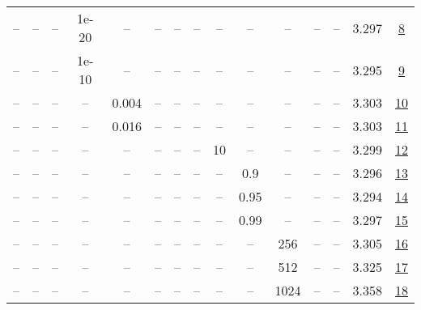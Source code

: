 \begin{table}[H]
\begin{tabular}{ccccccccccccccc}
-- & -- & -- & 1e-20 & -- & -- & -- & -- & -- & -- & -- & -- & -- & 3.297 & \href{https://wandb.ai/stanford-mercury/optimizer-scaling/runs/sweep-130m-10B-soap846796lr0.008-wd0.1-minlr0-warmup500-b10.95-b-6468ec}{8} \\
-- & -- & -- & 1e-10 & -- & -- & -- & -- & -- & -- & -- & -- & -- & 3.295 & \href{https://wandb.ai/stanford-mercury/optimizer-scaling/runs/sweep-130m-10B-soap9df2b8lr0.008-wd0.1-minlr0-warmup500-b10.95-b-6e382e}{9} \\
-- & -- & -- & -- & 0.004 & -- & -- & -- & -- & -- & -- & -- & -- & 3.303 & \href{https://wandb.ai/stanford-mercury/optimizer-scaling/runs/sweep-130m-10B-soap3d01e1lr0.004-wd0.1-minlr0-warmup500-b10.95-b-9d15d1}{10} \\
-- & -- & -- & -- & 0.016 & -- & -- & -- & -- & -- & -- & -- & -- & 3.303 & \href{https://wandb.ai/stanford-mercury/optimizer-scaling/runs/sweep-130m-10B-soapec37edlr0.016-wd0.1-minlr0-warmup500-b10.95-b-60744b}{11} \\
-- & -- & -- & -- & -- & -- & -- & -- & 10 & -- & -- & -- & -- & 3.299 & \href{https://wandb.ai/stanford-mercury/optimizer-scaling/runs/sweep-130m-10B-soap3a4be4lr0.008-wd0.1-minlr0-warmup500-b10.95-b-0fd663}{12} \\
-- & -- & -- & -- & -- & -- & -- & -- & -- & 0.9 & -- & -- & -- & 3.296 & \href{https://wandb.ai/stanford-mercury/optimizer-scaling/runs/sweep-130m-10B-soap54672clr0.008-wd0.1-minlr0-warmup500-b10.95-b-828dc2}{13} \\
-- & -- & -- & -- & -- & -- & -- & -- & -- & 0.95 & -- & -- & -- & 3.294 & \href{https://wandb.ai/stanford-mercury/optimizer-scaling/runs/sweep-130m-10B-soap3f490clr0.008-wd0.1-minlr0-warmup500-b10.95-b-abb09e}{14} \\
-- & -- & -- & -- & -- & -- & -- & -- & -- & 0.99 & -- & -- & -- & 3.297 & \href{https://wandb.ai/stanford-mercury/optimizer-scaling/runs/sweep-130m-10B-soap5615c7lr0.008-wd0.1-minlr0-warmup500-b10.95-b-89cba8}{15} \\
-- & -- & -- & -- & -- & -- & -- & -- & -- & -- & 256 & -- & -- & 3.305 & \href{https://wandb.ai/stanford-mercury/optimizer-scaling/runs/sweep-130m-10B-soapd838balr0.008-wd0.1-minlr0-warmup500-b10.95-b-f0e043}{16} \\
-- & -- & -- & -- & -- & -- & -- & -- & -- & -- & 512 & -- & -- & 3.325 & \href{https://wandb.ai/stanford-mercury/optimizer-scaling/runs/sweep-130m-10B-soap614e14lr0.008-wd0.1-minlr0-warmup500-b10.95-b-422ba8}{17} \\
-- & -- & -- & -- & -- & -- & -- & -- & -- & -- & 1024 & -- & -- & 3.358 & \href{https://wandb.ai/stanford-mercury/optimizer-scaling/runs/sweep-130m-10B-soap41dcd8lr0.008-wd0.1-minlr0-warmup500-b10.95-b-5b9a29}{18} \\

\end{tabular}
\end{table}
